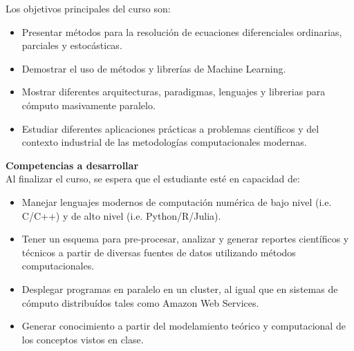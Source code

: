 \documentclass[letterpaper,10pt,onecolumn]{article}
\begin{document}
\noindent\normalsize Los objetivos principales del curso son:

\begin{itemize}

        \item Presentar m\'etodos para la resoluci\'on de ecuaciones
          diferenciales ordinarias, parciales y estoc\'asticas. \\[-0.6cm] 
        \item Demostrar el uso de m\'etodos y librer\'ias de Machine
          Learning. \\[-0.6cm]
        \item Mostrar diferentes arquitecturas, paradigmas, lenguajes
          y librerias para c\'omputo masivamente paralelo.
	\item Estudiar diferentes aplicaciones prácticas a problemas
          científicos y del contexto industrial de las metodologías
          computacionales modernas. \\[-0.6cm] 
\end{itemize}

\noindent\textbf{\large {} \quad Competencias a
  desarrollar}\\[-0.2cm] 


\noindent\normalsize Al finalizar el curso, se espera que el
estudiante est\'e en capacidad de: 

\begin{itemize}
\item Manejar lenguajes modernos de computación numérica de
  bajo nivel (i.e. C/C++) y de alto nivel
  (i.e. Python/R/Julia). \\[-0.6cm]
\item Tener un esquema para pre-procesar, analizar y generar
  reportes científicos y técnicos a partir de diversas fuentes
  de datos utilizando métodos computacionales. \\[-0.6cm] 
\item Desplegar programas en paralelo en un cluster, al
  igual que en sistemas de cómputo distribuídos tales como
  Amazon Web Services.\\[-0.6cm] 
\item Generar conocimiento a partir del modelamiento te\'orico
  y computacional de los conceptos vistos en clase.\\[-0.2cm]  
\end{itemize}
\end{document}

